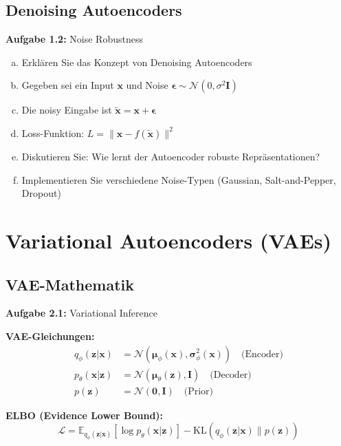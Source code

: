 \documentclass[12pt,a4paper]{article}
\begin{document}
\subsection{Denoising Autoencoders}

\textbf{Aufgabe 1.2:} Noise Robustness

\begin{enumerate}[(a)]
    \item Erklären Sie das Konzept von Denoising Autoencoders
    \item Gegeben sei ein Input $\mathbf{x}$ und Noise $\boldsymbol{\epsilon} \sim \mathcal{N}(0, \sigma^2 \mathbf{I})$
    \item Die noisy Eingabe ist $\tilde{\mathbf{x}} = \mathbf{x} + \boldsymbol{\epsilon}$
    \item Loss-Funktion: $L = \|\mathbf{x} - f(\tilde{\mathbf{x}})\|^2$
    \item Diskutieren Sie: Wie lernt der Autoencoder robuste Repräsentationen?
    \item Implementieren Sie verschiedene Noise-Typen (Gaussian, Salt-and-Pepper, Dropout)
\end{enumerate}

\section{Variational Autoencoders (VAEs)}

\subsection{VAE-Mathematik}

\textbf{Aufgabe 2.1:} Variational Inference

\textbf{VAE-Gleichungen:}
\begin{align}
q_\phi(\mathbf{z}|\mathbf{x}) &= \mathcal{N}(\boldsymbol{\mu}_\phi(\mathbf{x}), \boldsymbol{\sigma}_\phi^2(\mathbf{x})) \quad \text{(Encoder)} \\
p_\theta(\mathbf{x}|\mathbf{z}) &= \mathcal{N}(\boldsymbol{\mu}_\theta(\mathbf{z}), \mathbf{I}) \quad \text{(Decoder)} \\
p(\mathbf{z}) &= \mathcal{N}(\mathbf{0}, \mathbf{I}) \quad \text{(Prior)}
\end{align}

\textbf{ELBO (Evidence Lower Bound):}
\begin{equation}
\mathcal{L} = \mathbb{E}_{q_\phi(\mathbf{z}|\mathbf{x})}[\log p_\theta(\mathbf{x}|\mathbf{z})] - \text{KL}(q_\phi(\mathbf{z}|\mathbf{x}) \| p(\mathbf{z}))
\end{equation}
\end{document}
